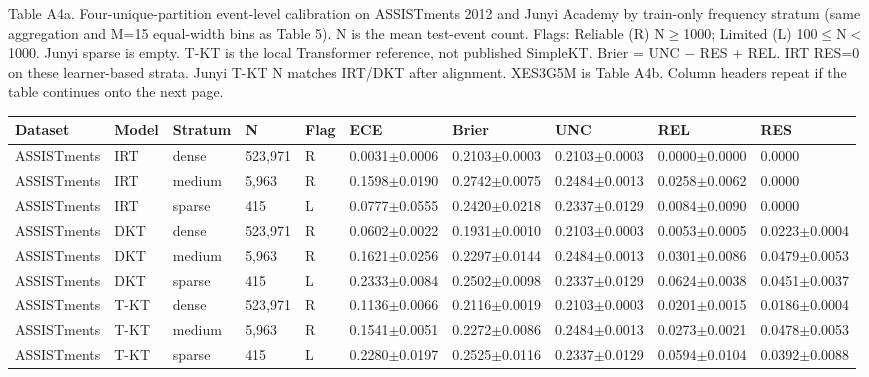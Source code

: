 \documentclass[10pt,a4paper]{article}
\begin{document}
\noindent\begin{minipage}{\textwidth}
\centering
{\fontsize{8}{9.5}\selectfont Table A4a. Four-unique-partition event-level calibration on ASSISTments 2012 and Junyi Academy by train-only frequency stratum (same aggregation and M=15 equal-width bins as Table 5). N is the mean test-event count. Flags: Reliable (R) N$\geq$1000; Limited (L) 100$\leq$N$<$1000. Junyi sparse is empty. T-KT is the local Transformer reference, not published SimpleKT. Brier = UNC $-$ RES + REL. IRT RES=0 on these learner-based strata. Junyi T-KT N matches IRT/DKT after alignment. XES3G5M is Table A4b. Column headers repeat if the table continues onto the next page.\par}
\vspace{0.35em}
\begin{adjustbox}{max width=\textwidth}
{\small
\begin{tabular}{@{}llllllllll@{}}
\toprule
Dataset & Model & Stratum & N & Flag & ECE & Brier & UNC & REL & RES \\
\midrule
ASSISTments & IRT & dense & 523,971 & R & 0.0031$\pm$0.0006 & 0.2103$\pm$0.0003 & 0.2103$\pm$0.0003 & 0.0000$\pm$0.0000 & 0.0000 \\
ASSISTments & IRT & medium & 5,963 & R & 0.1598$\pm$0.0190 & 0.2742$\pm$0.0075 & 0.2484$\pm$0.0013 & 0.0258$\pm$0.0062 & 0.0000 \\
ASSISTments & IRT & sparse & 415 & L & 0.0777$\pm$0.0555 & 0.2420$\pm$0.0218 & 0.2337$\pm$0.0129 & 0.0084$\pm$0.0090 & 0.0000 \\
ASSISTments & DKT & dense & 523,971 & R & 0.0602$\pm$0.0022 & 0.1931$\pm$0.0010 & 0.2103$\pm$0.0003 & 0.0053$\pm$0.0005 & 0.0223$\pm$0.0004 \\
ASSISTments & DKT & medium & 5,963 & R & 0.1621$\pm$0.0256 & 0.2297$\pm$0.0144 & 0.2484$\pm$0.0013 & 0.0301$\pm$0.0086 & 0.0479$\pm$0.0053 \\
ASSISTments & DKT & sparse & 415 & L & 0.2333$\pm$0.0084 & 0.2502$\pm$0.0098 & 0.2337$\pm$0.0129 & 0.0624$\pm$0.0038 & 0.0451$\pm$0.0037 \\
ASSISTments & T-KT & dense & 523,971 & R & 0.1136$\pm$0.0066 & 0.2116$\pm$0.0019 & 0.2103$\pm$0.0003 & 0.0201$\pm$0.0015 & 0.0186$\pm$0.0004 \\
ASSISTments & T-KT & medium & 5,963 & R & 0.1541$\pm$0.0051 & 0.2272$\pm$0.0086 & 0.2484$\pm$0.0013 & 0.0273$\pm$0.0021 & 0.0478$\pm$0.0053 \\
ASSISTments & T-KT & sparse & 415 & L & 0.2280$\pm$0.0197 & 0.2525$\pm$0.0116 & 0.2337$\pm$0.0129 & 0.0594$\pm$0.0104 & 0.0392$\pm$0.0088 \\

\end{tabular}}
\end{adjustbox}
\end{minipage}
\end{document}
